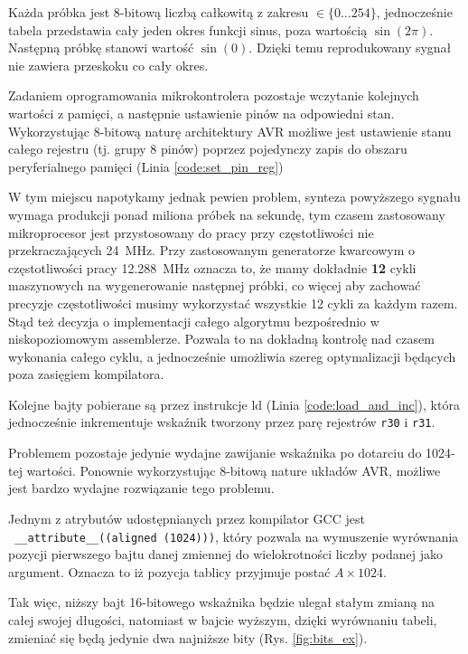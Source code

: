 \documentclass[12pt, a4paper]{article}
\begin{document}
Każda próbka jest 8-bitową liczbą całkowitą z zakresu $\in \{0 \dots 254\}$, jednocześnie tabela przedstawia cały jeden okres funkcji sinus,
poza wartością $\sin (2 \pi)$. Następną próbkę stanowi wartość $\sin (0)$. Dzięki temu reprodukowany sygnał nie zawiera przeskoku co cały okres.

Zadaniem oprogramowania mikrokontrolera pozostaje wczytanie kolejnych wartości z pamięci,
a następnie ustawienie pinów na odpowiedni stan. Wykorzystując 8-bitową naturę architektury AVR
możliwe jest ustawienie stanu całego rejestru (tj. grupy 8 pinów) poprzez pojedynczy zapis do 
obszaru peryferialnego pamięci (Linia \ref{code:set_pin_reg})

W tym miejscu napotykamy jednak pewien problem, synteza powyższego sygnału wymaga produkcji ponad miliona próbek na sekundę,
tym czasem zastosowany mikroprocesor jest przystosowany do pracy przy częstotliwości nie przekraczających \qty{24}{\MHz}.
Przy zastosowanym generatorze kwarcowym o częstotliwości pracy \qty{12,288}{\MHz} oznacza to, że mamy dokładnie \textbf{12} cykli maszynowych
na wygenerowanie następnej próbki, co więcej aby zachować precyzje częstotliwości musimy wykorzystać wszystkie 12 cykli za każdym razem.
Stąd też decyzja o implementacji całego algorytmu bezpośrednio w niskopoziomowym assemblerze.
Pozwala to na dokładną kontrolę nad czasem wykonania całego cyklu, a jednocześnie umożliwia szereg optymalizacji
będących poza zasięgiem kompilatora.

Kolejne bajty pobierane są przez instrukcje ld (Linia \ref{code:load_and_inc}), która jednocześnie
inkrementuje wskaźnik tworzony przez parę rejestrów \verb|r30| i \verb|r31|.

Problemem pozostaje jedynie wydajne zawijanie wskaźnika po dotarciu do 1024-tej wartości.
Ponownie wykorzystując 8-bitową nature układów AVR, możliwe jest bardzo wydajne rozwiązanie tego problemu.

Jednym z atrybutów udostępnianych przez kompilator GCC jest\\
\verb| __attribute__((aligned (1024)))|, który pozwala na wymuszenie
wyrównania pozycji pierwszego bajtu danej zmiennej do wielokrotności liczby podanej jako argument.
Oznacza to iż pozycja tablicy przyjmuje postać $A \times 1024$.

Tak więc, niższy bajt 16-bitowego wskaźnika będzie ulegał stałym zmianą na całej swojej długości,
natomiast w bajcie wyższym, dzięki wyrównaniu tabeli, zmieniać się będą jedynie dwa najniższe bity (Rys. \ref{fig:bits_ex}).
\end{document}
